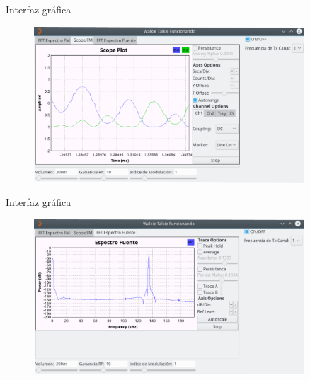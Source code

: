 \begin{frame}{Interfaz gráfica}

\begin{figure}[H]
\centering
\vspace{-3mm}
\includegraphics[width=0.9\textwidth]{parte3/lab14/pdf/Lab14_10.pdf}
\end{figure}

\end{frame}

\begin{frame}{Interfaz gráfica}

\begin{figure}[H]
\centering
\vspace{-3mm}
\includegraphics[width=0.9\textwidth]{parte3/lab14/pdf/Lab14_11.pdf}
\end{figure}

\end{frame}
